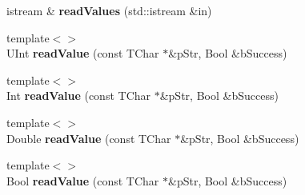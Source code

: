 \begin{DoxyCompactItemize}
\item 
\mbox{\label{struct_s_multi_value_input_a3f71e03b83bef3b4fba7a8baff539d24}} 
istream \& {\bfseries read\+Values} (std\+::istream \&in)
\item 
\mbox{\label{struct_s_multi_value_input_ab218f0ea24ed652aa6f8980959b97bee}} 
{\footnotesize template$<$$>$ }\\U\+Int {\bfseries read\+Value} (const T\+Char $\ast$\&p\+Str, Bool \&b\+Success)
\item 
\mbox{\label{struct_s_multi_value_input_a54064181ae79c9e456ccbb471297604f}} 
{\footnotesize template$<$$>$ }\\Int {\bfseries read\+Value} (const T\+Char $\ast$\&p\+Str, Bool \&b\+Success)
\item 
\mbox{\label{struct_s_multi_value_input_a064eac2d4be084a4a28b44664a66c9cc}} 
{\footnotesize template$<$$>$ }\\Double {\bfseries read\+Value} (const T\+Char $\ast$\&p\+Str, Bool \&b\+Success)
\item 
\mbox{\label{struct_s_multi_value_input_a74f7b544ceb220bb04c55bf7847cf4e1}} 
{\footnotesize template$<$$>$ }\\Bool {\bfseries read\+Value} (const T\+Char $\ast$\&p\+Str, Bool \&b\+Success)
\end{DoxyCompactItemize}

